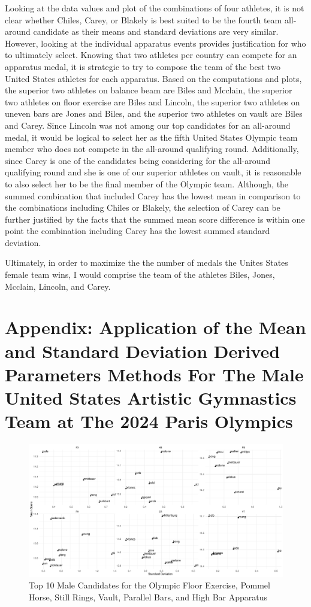 \documentclass[12pt]{article}
\begin{document}
Looking at the data values and plot of the combinations of four athletes, it is not clear whether Chiles, Carey, or 
Blakely is best suited to be the fourth team all-around candidate as their means and standard deviations are very 
similar. However, looking at the individual apparatus events provides justification for who to ultimately select. 
Knowing that two athletes per country can compete for an apparatus medal, it is strategic to try to compose the 
team of the best two United States athletes for each apparatus. Based on the computations and plots, the superior two 
athletes on balance beam are Biles and Mcclain, the superior two athletes on floor exercise are Biles and Lincoln, 
the superior two athletes on uneven bars are Jones and Biles, and the superior two athletes on vault are Biles 
and Carey. Since Lincoln was not among our top candidates for an all-around medal, it would be logical to select her 
as the fifth United States Olympic team member who does not compete in the all-around qualifying round. Additionally, 
since Carey is one of the candidates being considering for the all-around qualifying round and she is one of our superior 
athletes on vault, it is reasonable to also select her to be the final member of the Olympic team. Although, the 
summed combination that included Carey has the lowest mean in comparison to the combinations including Chiles or 
Blakely, the selection of Carey can be further justified by the facts that the summed mean score difference is 
within one point the combination including Carey has the lowest summed standard deviation.

Ultimately, in order to maximize the the number of medals the Unites States female team wins, I would comprise the 
team of the athletes Biles, Jones, Mcclain, Lincoln, and Carey.

\appendix

\section{Appendix: Application of the Mean and Standard Deviation Derived Parameters Methods For The Male 
United States Artistic Gymnastics Team at The 2024 Paris Olympics}

\begin{figure}
  \centering
  \includegraphics[scale=0.5]{MaleAthleteApparatus.pdf}
  \caption{Top 10 Male Candidates for the Olympic Floor Exercise, Pommel Horse, Still Rings, Vault, Parallel Bars, 
  and High Bar Apparatus}
  \label{fig:FA}
\end{figure}
\end{document}
